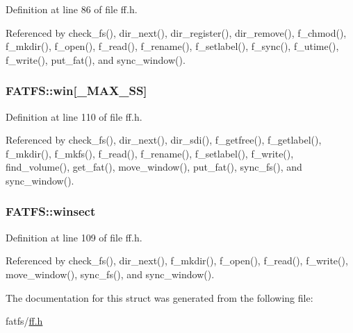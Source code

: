 Definition at line 86 of file ff.\+h.



Referenced by check\+\_\+fs(), dir\+\_\+next(), dir\+\_\+register(), dir\+\_\+remove(), f\+\_\+chmod(), f\+\_\+mkdir(), f\+\_\+open(), f\+\_\+read(), f\+\_\+rename(), f\+\_\+setlabel(), f\+\_\+sync(), f\+\_\+utime(), f\+\_\+write(), put\+\_\+fat(), and sync\+\_\+window().

\subsubsection[{\texorpdfstring{win}{win}}]{ F\+A\+T\+F\+S\+::win\mbox{[}{\bf \+\_\+\+M\+A\+X\+\_\+\+SS}\mbox{]}}\hypertarget{structFATFS_a7cc35a593465e727ab87723c14610644}{}\label{structFATFS_a7cc35a593465e727ab87723c14610644}


Definition at line 110 of file ff.\+h.



Referenced by check\+\_\+fs(), dir\+\_\+next(), dir\+\_\+sdi(), f\+\_\+getfree(), f\+\_\+getlabel(), f\+\_\+mkdir(), f\+\_\+mkfs(), f\+\_\+read(), f\+\_\+rename(), f\+\_\+setlabel(), f\+\_\+write(), find\+\_\+volume(), get\+\_\+fat(), move\+\_\+window(), put\+\_\+fat(), sync\+\_\+fs(), and sync\+\_\+window().

\subsubsection[{\texorpdfstring{winsect}{winsect}}]{ F\+A\+T\+F\+S\+::winsect}\hypertarget{structFATFS_ac60e69c00e6bf7c25febfbac4dc1476b}{}\label{structFATFS_ac60e69c00e6bf7c25febfbac4dc1476b}


Definition at line 109 of file ff.\+h.



Referenced by check\+\_\+fs(), dir\+\_\+next(), f\+\_\+mkdir(), f\+\_\+open(), f\+\_\+read(), f\+\_\+write(), move\+\_\+window(), sync\+\_\+fs(), and sync\+\_\+window().



The documentation for this struct was generated from the following file\+:\begin{DoxyCompactItemize}
\item 
fatfs/\hyperlink{ff_8h}{ff.\+h}\end{DoxyCompactItemize}
